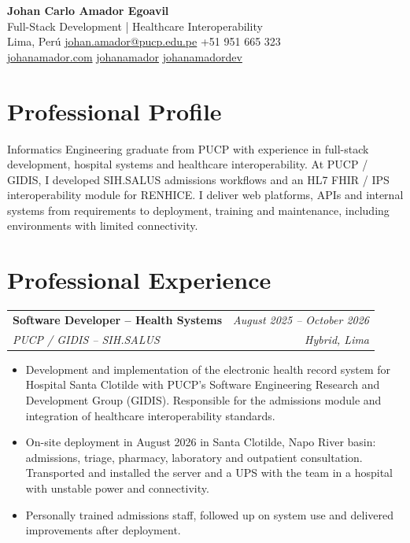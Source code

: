 \documentclass[a4paper,10pt]{article}
\makeatletter
\newcommand{\cvsubheading}[4]{
  \vspace{2pt}
  \begin{tabularx}{\textwidth}{@{}X r@{}}
    \textbf{#1} & \textit{\small #2} \\
    \textit{\small\color{graytext} #3} & \textit{\small\color{graytext} #4} \\
  \end{tabularx}\vspace{-2pt}
}
\makeatother
\begin{document}
\begin{center}
  {\LARGE\bfseries Johan Carlo Amador Egoavil} \\[3pt]
  {\small\color{graytext} Full-Stack Development | Healthcare Interoperability} \\[6pt]
  \small
  \enspace Lima, Per\'u \quad
  \enspace \href{mailto:johan.amador@pucp.edu.pe}{johan.amador@pucp.edu.pe} \quad
  \enspace +51 951 665 323 \\[3pt]
  \enspace \href{https://johanamador.com}{johanamador.com} \quad
  \enspace \href{https://github.com/johanamador}{johanamador} \quad
  \enspace \href{https://www.linkedin.com/in/johanamadordev/}{johanamadordev}
\end{center}

\section{Professional Profile}
Informatics Engineering graduate from PUCP with experience in full-stack development, hospital systems and healthcare interoperability. At PUCP / GIDIS, I developed SIH.SALUS admissions workflows and an HL7 FHIR / IPS interoperability module for RENHICE. I deliver web platforms, APIs and internal systems from requirements to deployment, training and maintenance, including environments with limited connectivity.

\section{Professional Experience}

\cvsubheading
  {Software Developer -- Health Systems}{August 2025 -- October 2026}
  {PUCP / GIDIS -- SIH.SALUS}{Hybrid, Lima}
\begin{itemize}[leftmargin=16pt, itemsep=1.5pt, parsep=0pt, topsep=3pt]
  \item Development and implementation of the electronic health record system for Hospital Santa Clotilde with PUCP's Software Engineering Research and Development Group (GIDIS). Responsible for the admissions module and integration of healthcare interoperability standards.
  \item On-site deployment in August 2026 in Santa Clotilde, Napo River basin: admissions, triage, pharmacy, laboratory and outpatient consultation. Transported and installed the server and a UPS with the team in a hospital with unstable power and connectivity.
  \item Personally trained admissions staff, followed up on system use and delivered improvements after deployment.
\end{itemize}
\end{document}
